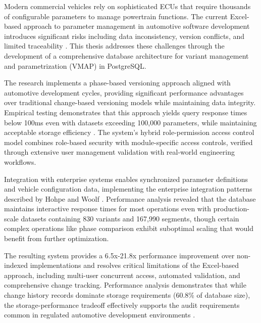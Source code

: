 Modern commercial vehicles rely on sophisticated \acp{ECU} that require thousands of configurable parameters to manage powertrain functions. The current Excel-based approach to parameter management in automotive software development introduces significant risks including data inconsistency, version conflicts, and limited traceability \cite{trovao2024evolution}. This thesis addresses these challenges through the development of a comprehensive database architecture for variant management and parametrization (VMAP) in PostgreSQL. 
	
The research implements a phase-based versioning approach aligned with automotive development cycles, providing significant performance advantages over traditional change-based versioning models while maintaining data integrity. Empirical testing demonstrates that this approach yields query response times below 100ms even with datasets exceeding 100,000 parameters, while maintaining acceptable storage efficiency \cite{bhattacherjee2015principles}. The system's hybrid role-permission access control model combines role-based security with module-specific access controls, verified through extensive user management validation with real-world engineering workflows.
	
Integration with enterprise systems enables synchronized parameter definitions and vehicle configuration data, implementing the enterprise integration patterns described by Hohpe and Woolf \cite{hohpe2002enterprise}. Performance analysis revealed that the database maintains interactive response times for most operations even with production-scale datasets containing 830 variants and 167,990 segments, though certain complex operations like phase comparison exhibit suboptimal scaling that would benefit from further optimization.
	
The resulting system provides a 6.5x-21.8x performance improvement over non-indexed implementations and resolves critical limitations of the Excel-based approach, including multi-user concurrent access, automated validation, and comprehensive change tracking. Performance analysis demonstrates that while change history records dominate storage requirements (60.8\% of database size), the storage-performance tradeoff effectively supports the audit requirements common in regulated automotive development environments \cite{staron2021automotive}.












\newpage
\makeatletter
	\if@twoside%
   		\cleardoublepage
   		
	\else%
	\fi%
\makeatother